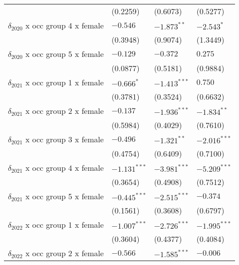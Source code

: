 \begin{tabular}{llll}
                                       &           (0.2259) &           (0.6073) &           (0.5277) \\
$\delta_{2020}$ x occ group 4 x female &           $-0.546$ &      $-1.873^{**}$ &         $-2.543^*$ \\
                                       &           (0.3948) &           (0.9074) &           (1.3449) \\
$\delta_{2020}$ x occ group 5 x female &           $-0.129$ &           $-0.372$ &            $0.275$ \\
                                       &           (0.0877) &           (0.5181) &           (0.9884) \\
$\delta_{2021}$ x occ group 1 x female &         $-0.666^*$ &     $-1.413^{***}$ &            $0.750$ \\
                                       &           (0.3781) &           (0.3524) &           (0.6632) \\
$\delta_{2021}$ x occ group 2 x female &           $-0.137$ &     $-1.936^{***}$ &      $-1.834^{**}$ \\
                                       &           (0.5984) &           (0.4029) &           (0.7610) \\
$\delta_{2021}$ x occ group 3 x female &           $-0.496$ &      $-1.321^{**}$ &     $-2.016^{***}$ \\
                                       &           (0.4754) &           (0.6409) &           (0.7100) \\
$\delta_{2021}$ x occ group 4 x female &     $-1.131^{***}$ &     $-3.981^{***}$ &     $-5.209^{***}$ \\
                                       &           (0.3654) &           (0.4908) &           (0.7512) \\
$\delta_{2021}$ x occ group 5 x female &     $-0.445^{***}$ &     $-2.515^{***}$ &           $-0.374$ \\
                                       &           (0.1561) &           (0.3608) &           (0.6797) \\
$\delta_{2022}$ x occ group 1 x female &     $-1.007^{***}$ &     $-2.726^{***}$ &     $-1.995^{***}$ \\
                                       &           (0.3604) &           (0.4377) &           (0.4084) \\
$\delta_{2022}$ x occ group 2 x female &           $-0.566$ &     $-1.585^{***}$ &           $-0.006$ \\

\end{tabular}
